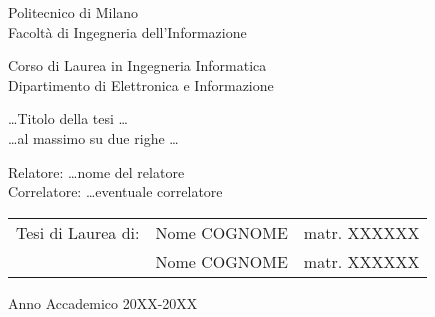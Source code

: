 \begin{titlepage}
\vspace*{-2.5cm}
\bfseries
\begin{center}
  \LARGE
  Politecnico di Milano\\
  \Large
  Facolt\`{a} di Ingegneria dell'Informazione\\


\begin{large}
Corso di Laurea in Ingegneria Informatica\\
Dipartimento di Elettronica e Informazione\\
\end{large}

\vspace{1.0cm}
\begin{Large}
\dots Titolo della tesi \dots\\
\dots al massimo su due righe \dots
\end{Large}  
\end{center}
\vspace*{5.5cm}
\large
\begin{flushleft}
\hspace{-2cm}  Relatore: \dots nome del relatore\\
\hspace{-2cm}  Correlatore: \dots eventuale correlatore\\
\end{flushleft}
\vspace*{1.5cm}

\hspace{1cm}
\parbox{14cm}{
    \begin{tabular}{lll}
        Tesi di Laurea di: & Nome COGNOME     & matr. XXXXXX\\
                           & Nome COGNOME     & matr. XXXXXX\\
    \end{tabular}
}




\vspace*{1.5cm}
\begin{center}



  Anno Accademico 20XX-20XX



\end{center}
\end{titlepage}
\cleardoublepage

